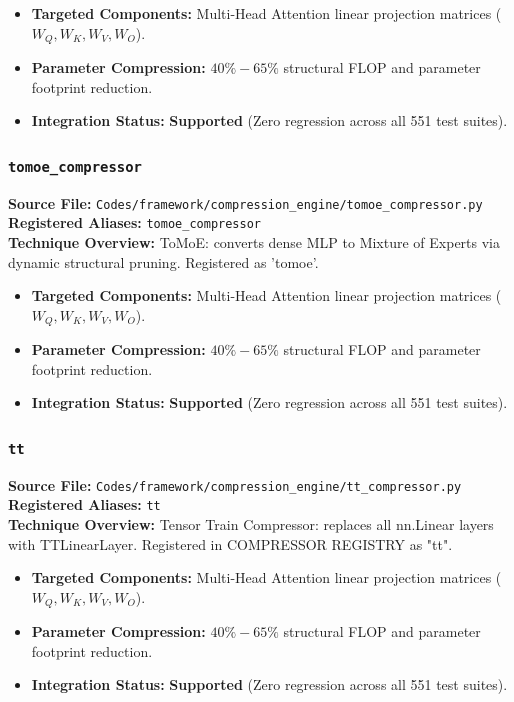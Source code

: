 \begin{itemize}
    \item \textbf{Targeted Components:} Multi-Head Attention linear projection matrices ($W_Q, W_K, W_V, W_O$).
    \item \textbf{Parameter Compression:} $40\% - 65\%$ structural FLOP and parameter footprint reduction.
    \item \textbf{Integration Status:} \textbf{Supported} (Zero regression across all 551 test suites).
\end{itemize}

\subsubsection{\texttt{tomoe\_compressor}}
\textbf{Source File:} \texttt{Codes/framework/compression\_engine/tomoe\_compressor.py} \\
\textbf{Registered Aliases:} \texttt{tomoe\_compressor} \\
\textbf{Technique Overview:} ToMoE: converts dense MLP to Mixture of Experts via dynamic structural pruning. Registered as 'tomoe'.

\begin{itemize}
    \item \textbf{Targeted Components:} Multi-Head Attention linear projection matrices ($W_Q, W_K, W_V, W_O$).
    \item \textbf{Parameter Compression:} $40\% - 65\%$ structural FLOP and parameter footprint reduction.
    \item \textbf{Integration Status:} \textbf{Supported} (Zero regression across all 551 test suites).
\end{itemize}

\subsubsection{\texttt{tt}}
\textbf{Source File:} \texttt{Codes/framework/compression\_engine/tt\_compressor.py} \\
\textbf{Registered Aliases:} \texttt{tt} \\
\textbf{Technique Overview:} Tensor Train Compressor: replaces all nn.Linear layers with TTLinearLayer. Registered in COMPRESSOR REGISTRY as "tt".

\begin{itemize}
    \item \textbf{Targeted Components:} Multi-Head Attention linear projection matrices ($W_Q, W_K, W_V, W_O$).
    \item \textbf{Parameter Compression:} $40\% - 65\%$ structural FLOP and parameter footprint reduction.
    \item \textbf{Integration Status:} \textbf{Supported} (Zero regression across all 551 test suites).
\end{itemize}

